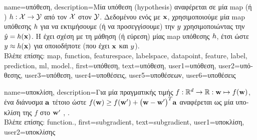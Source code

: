 {name={\foreignlanguage{greek}{υπόθεση}},
	description={\foreignlanguage{greek}{Μία υπόθεση} (hypothesis) 
		\foreignlanguage{greek}{αναφέρεται σε μία} \gls{map} \foreignlanguage{greek}{(ή} ) 
		$h: \mathcal{X} \rightarrow \mathcal{Y}$ \foreignlanguage{greek}{από τον}  
		 $\mathcal{X}$ \foreignlanguage{greek}{στον}  $\mathcal{Y}$. 
		\foreignlanguage{greek}{Δεδομένου ενός}  \foreignlanguage{greek}{με}  ${\bf x}$, 
		\foreignlanguage{greek}{χρησιμοποι\-ού\-με μία} \gls{map} \foreignlanguage{greek}{υπόθεσης $h$
		για να εκτιμήσουμε (ή να προσεγγίσουμε) την}  $y$ \foreignlanguage{greek}{χρησιμοποιώντας την} 
		 $\hat{y} = h({\bf x})$. \foreignlanguage{greek}{Η}  
		\foreignlanguage{greek}{έχει σχέση με τη μάθηση (ή εύρεση) μίας} \gls{map} \foreignlanguage{greek}{υπόθεσης 
		$h$, έτσι ώστε $y \approx h({\bf x})$ 
		για οποιοδήποτε}  \foreignlanguage{greek}{(που έχει}  ${\bf x}$ 
		\foreignlanguage{greek}{και}  $y$).\\
		\foreignlanguage{greek}{Βλέπε επίσης:} \gls{map}, \gls{function}, \gls{featurespace}, \gls{labelspace}, \gls{datapoint}, \gls{feature}, 
		\gls{label}, \gls{prediction}, \gls{ml}, \gls{model}.},
	first={\foreignlanguage{greek}{υπόθεση}},
	text={\foreignlanguage{greek}{υπόθεση}},
	user1={\foreignlanguage{greek}{υπόθεση}}, %
	user2={\foreignlanguage{greek}{υπόθεσης}}, %
	user3={\foreignlanguage{greek}{υπόθεση}}, %
	user4={\foreignlanguage{greek}{υποθέσεις}}, %
	user5={\foreignlanguage{greek}{υποθέσεων}}, %
	user6={\foreignlanguage{greek}{υποθέσεις}} %
}

{name={\foreignlanguage{greek}{υποκλίση}},
	description={\foreignlanguage{greek}{Για μία}  
		\foreignlanguage{greek}{πραγματικής τιμής $f: \mathbb{R}^{d} \rightarrow \mathbb{R}: {\bf w} \mapsto f({\bf w})$, 
		ένα διάνυσμα ${\bf a}$ τέτοιο ώστε $f({\bf w}) \geq  f({\bf w}') +\big({\bf w}-{\bf w}' \big)^{T} {\bf a}$ 
		αναφέρεται ως μία υποκλίση της $f$ στο} ${\bf w}'$ \cite{BertCvxAnalOpt}, \cite{BertsekasNonLinProgr}.\\
		\foreignlanguage{greek}{Βλέπε επίσης:} \gls{function}.},
	first={subgradient},
	text={subgradient},
	user1={\foreignlanguage{greek}{υποκλίση}}, %
	user2={\foreignlanguage{greek}{υποκλίσης}} %
}

